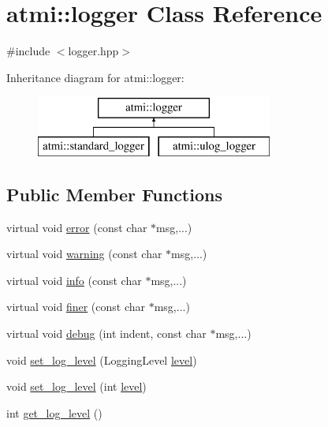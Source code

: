 \hypertarget{classatmi_1_1logger}{}\section{atmi\+:\+:logger Class Reference}
\label{classatmi_1_1logger}


{\ttfamily \#include $<$logger.\+hpp$>$}

Inheritance diagram for atmi\+:\+:logger\+:\begin{figure}[H]
\begin{center}
\leavevmode
\includegraphics[height=2.000000cm]{classatmi_1_1logger}
\end{center}
\end{figure}
\subsection*{Public Member Functions}
\begin{DoxyCompactItemize}
\item 
virtual void \hyperlink{classatmi_1_1logger_a15a9a69cc9031f26e38cf8594ed2377a}{error} (const char $\ast$msg,...)
\item 
virtual void \hyperlink{classatmi_1_1logger_a962acd49cbba69ec175b25321e2198be}{warning} (const char $\ast$msg,...)
\item 
virtual void \hyperlink{classatmi_1_1logger_a3b3a3ab94d7808bddf99c21d0307fa6d}{info} (const char $\ast$msg,...)
\item 
virtual void \hyperlink{classatmi_1_1logger_a6862a08d685fce50791530fc0c011841}{finer} (const char $\ast$msg,...)
\item 
virtual void \hyperlink{classatmi_1_1logger_a6ccf708a9c54be81433f7164a5bf33a4}{debug} (int indent, const char $\ast$msg,...)
\item 
void \hyperlink{classatmi_1_1logger_aa8c3743cb153dd802e8e556d020b65cb}{set\+\_\+log\+\_\+level} (Logging\+Level \hyperlink{classatmi_1_1logger_a70bf3a05b911b63d4548507fdea5dfbd}{level})
\item 
void \hyperlink{classatmi_1_1logger_a2da95e739145fb4aebeb4bb453c377ba}{set\+\_\+log\+\_\+level} (int \hyperlink{classatmi_1_1logger_a70bf3a05b911b63d4548507fdea5dfbd}{level})
\item 
int \hyperlink{classatmi_1_1logger_a52684cd4c56773570540c62cfdc5c6c8}{get\+\_\+log\+\_\+level} ()
\end{DoxyCompactItemize}
